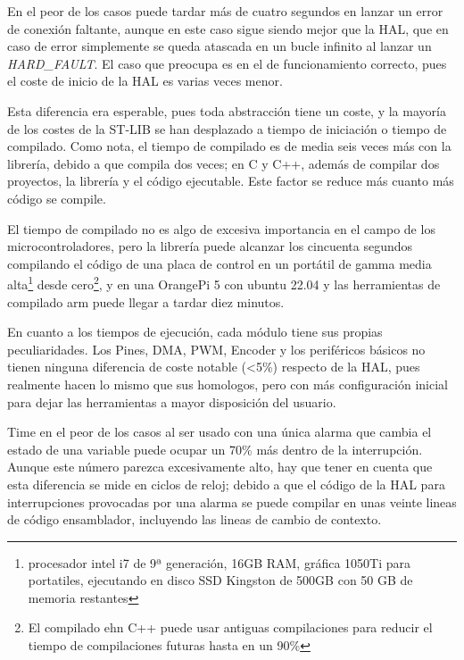 \documentclass{report}
\begin{document}
En el peor de los casos puede tardar más de cuatro segundos en lanzar un error de conexión faltante, aunque en este caso sigue siendo mejor que la HAL, que en caso de error simplemente se queda atascada en un bucle infinito al lanzar un \textit{HARD\_FAULT}. El caso que preocupa es en el de funcionamiento correcto, pues el coste de inicio de la HAL es varias veces menor.
\par
Esta diferencia era esperable, pues toda abstracción tiene un coste, y la mayoría de los costes de la ST-LIB se han desplazado a tiempo de iniciación o tiempo de compilado. Como nota, el tiempo de compilado es de media seis veces más con la librería, debido a que compila dos veces; en C y C++, además de compilar dos proyectos, la librería y el código ejecutable. Este factor se reduce más cuanto más código se compile. 
\par \vspace{0.3cm}
El tiempo de compilado no es algo de excesiva importancia en el campo de los microcontroladores, pero la librería puede alcanzar los cincuenta segundos compilando el código de una placa de control\cite{web:github:TCU} en un portátil de gamma media alta\footnote{procesador intel i7 de 9ª generación, 16GB RAM, gráfica 1050Ti para portatiles, ejecutando en disco SSD Kingston de 500GB con 50 GB de memoria restantes} desde cero\footnote{El compilado ehn C++ puede usar antiguas compilaciones para reducir el tiempo de compilaciones futuras hasta en un 90\%}, y en una OrangePi 5 con ubuntu 22.04 y las herramientas de compilado arm puede llegar a tardar diez minutos. 
\par \vspace{0.3cm}
En cuanto a los tiempos de ejecución, cada módulo tiene sus propias peculiaridades. Los Pines, DMA, PWM, Encoder y los periféricos básicos no tienen ninguna diferencia de coste notable (<5\%) respecto de la HAL, pues realmente hacen lo mismo que sus homologos, pero con más configuración inicial para dejar las herramientas a mayor disposición del usuario.
\par 
Time en el peor de los casos al ser usado con una única alarma que cambia el estado de una variable puede ocupar un 70\% más dentro de la interrupción. Aunque este número parezca excesivamente alto, hay que tener en cuenta que esta diferencia se mide en ciclos de reloj; debido a que el código de la HAL para interrupciones provocadas por una alarma se puede compilar en unas veinte lineas de código ensamblador, incluyendo las lineas de cambio de contexto. 
\par \vspace{0.3cm}
\end{document}
